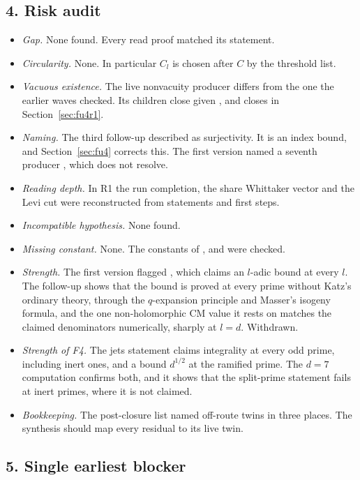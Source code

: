 \documentclass[11pt]{article}
\theoremstyle{remark}
\begin{document}
\subsection*{4. Risk audit}

\begin{itemize}[nosep]
\item \emph{Gap.} None found. Every read proof matched its statement.
\item \emph{Circularity.} None. In particular $C_l$ is chosen after $C$ by the threshold list.
\item \emph{Vacuous existence.} The live nonvacuity producer differs from the one the earlier waves checked. Its children close given , and  closes in Section~\ref{sec:fu4r1}.
\item \emph{Naming.} The third follow-up described  as surjectivity. It is an index bound, and Section~\ref{sec:fu4} corrects this. The first version named a seventh  producer , which does not resolve.
\item \emph{Reading depth.} In R1 the run completion, the share Whittaker vector and the Levi cut were reconstructed from statements and first steps.
\item \emph{Incompatible hypothesis.} None found.
\item \emph{Missing constant.} None. The constants of ,  and  were checked.
\item \emph{Strength.} The first version flagged , which claims an $l$-adic bound at every $l$. The follow-up shows that the bound is proved at every prime without Katz's ordinary theory, through the $q$-expansion principle and Masser's isogeny formula, and the one non-holomorphic CM value it rests on matches the claimed denominators numerically, sharply at $l=d$. Withdrawn.
\item \emph{Strength of F4.} The jets statement claims integrality at every odd prime, including inert ones, and a bound $d^{1/2}$ at the ramified prime. The $d=7$ computation confirms both, and it shows that the split-prime statement fails at inert primes, where it is not claimed.
\item \emph{Bookkeeping.} The post-closure list named off-route twins in three places. The synthesis should map every residual to its live twin.
\end{itemize}

\subsection*{5. Single earliest blocker}
\end{document}
